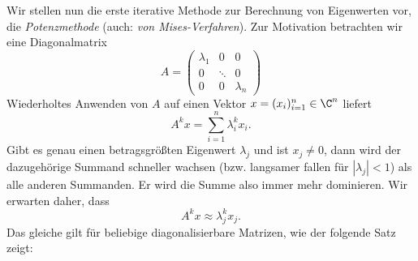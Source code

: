 \documentclass[
]{mycourse}
\theoremstyle{mythm}
\theoremstyle{break}
\begin{document}
Wir stellen nun die erste iterative Methode zur Berechnung von Eigenwerten vor, die \emph{Potenzmethode} (auch: \emph{von Mises-Verfahren}).
 Zur Motivation betrachten wir eine
Diagonalmatrix 
\[
A=\begin{pmatrix} \lambda_1 & 0 & 0\\ 0 & \ddots & 0\\ 0 & 0 & \lambda_n\end{pmatrix}
\]
Wiederholtes Anwenden von $A$ auf einen Vektor $x=(x_i)_{i=1}^n\in \C^n$ liefert
\[
A^k x=\sum_{i=1}^n \lambda_i^k x_i.
\]
Gibt es genau einen betragsgrößten Eigenwert $\lambda_j$ und ist $x_j\neq 0$, dann wird der dazugehörige Summand schneller
wachsen (bzw. langsamer fallen für $|\lambda_j|<1$) als alle anderen Summanden. Er wird die Summe also immer mehr dominieren.
Wir erwarten daher, dass
\[
A^k x\approx \lambda_j^k x_j.
\]
Das gleiche gilt für beliebige diagonalisierbare Matrizen, wie der folgende Satz zeigt:
\end{document}
